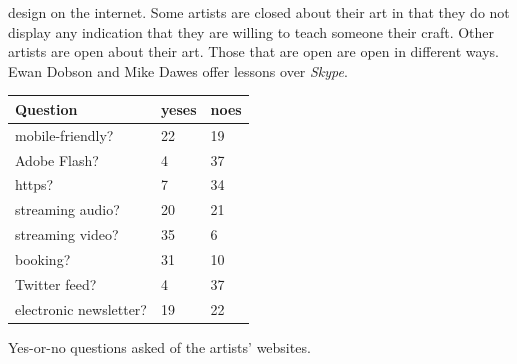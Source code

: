 \documentclass[nofonts,nobib]{tufte-handout}
\begin{document}
design on the internet. Some artists are closed about their art in that they
do not display any indication that they are willing to teach someone their
craft. Other artists are open about their art. Those that are open are open in
different ways. Ewan Dobson and Mike Dawes offer lessons over \emph{Skype}.
\begin{margintable}\centering
  \small
  \begin{tabular}{p{} l l}\toprule
    Question & yeses & noes \\\midrule
    mobile-friendly? & 22 & 19\\
    Adobe Flash? & 4 & 37\\
    https? & 7 & 34\\
    streaming audio? & 20 & 21\\
    streaming video? & 35 & 6\\
    booking? & 31 & 10\\
    Twitter feed? & 4 & 37\\
    electronic newsletter? & 19 & 22\\
    \bottomrule
  \end{tabular}
  \vspace{6pt}
  \caption{Yes-or-no questions asked of the artists' websites.}
\end{margintable}
\end{document}
